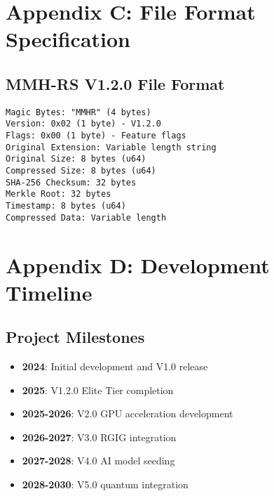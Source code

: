\documentclass[12pt,a4paper]{article}
\begin{document}
\section{Appendix C: File Format Specification}
\subsection{MMH-RS V1.2.0 File Format}
\begin{lstlisting}[caption=File Format Details]
Magic Bytes: "MMHR" (4 bytes)
Version: 0x02 (1 byte) - V1.2.0
Flags: 0x00 (1 byte) - Feature flags
Original Extension: Variable length string
Original Size: 8 bytes (u64)
Compressed Size: 8 bytes (u64)
SHA-256 Checksum: 32 bytes
Merkle Root: 32 bytes
Timestamp: 8 bytes (u64)
Compressed Data: Variable length
\end{lstlisting}

\section{Appendix D: Development Timeline}
\subsection{Project Milestones}
\begin{itemize}
    \item \textbf{2024}: Initial development and V1.0 release
    \item \textbf{2025}: V1.2.0 Elite Tier completion
    \item \textbf{2025-2026}: V2.0 GPU acceleration development
    \item \textbf{2026-2027}: V3.0 RGIG integration
    \item \textbf{2027-2028}: V4.0 AI model seeding
    \item \textbf{2028-2030}: V5.0 quantum integration
\end{itemize}
\end{document}
